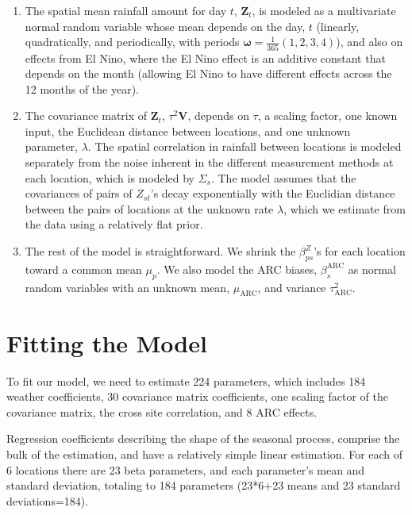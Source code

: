 \documentclass[12pt]{article}
\def\bomega{\pmb{\omega}}
\def\bZ{\pmb{Z}}
\def\bV{\pmb{V}}
\begin{document}
\begin{enumerate}
\item The spatial mean rainfall amount for day $t$, $\bZ_t$, is modeled as a multivariate normal random variable whose mean depends on the day, $t$ (linearly, quadratically, and periodically, with periods $\bomega = \frac{1}{365}(1, 2, 3, 4)$), and also on effects from El Nino, where the El Nino effect is an additive constant that depends on the month (allowing El Nino to have different effects across the 12 months of the year).
\item The covariance matrix of $\bZ_t$, $\tau^2\bV$, depends on $\tau$, a scaling factor, one known input, the Euclidean distance between locations, and one unknown parameter, $\lambda$. The spatial correlation in rainfall between locations is modeled separately from the noise inherent in the different measurement methods at each location, which is modeled by $\Sigma_s$. The model assumes that the covariances of pairs of $Z_{st}$'s decay exponentially with the Euclidian distance between the pairs of locations at the unknown rate $\lambda$, which we estimate from the data using a relatively flat prior.
\item The rest of the model is straightforward. We shrink the $\beta_{ps}^Z$'s for each location toward a common mean $\mu_p$. We also model the ARC biases, $\beta^\text{ARC}_s$ as normal random variables with an unknown mean, $\mu_\text{ARC}$, and variance $\tau_\text{ARC}^2$.
\end{enumerate}

\section{Fitting the Model}
\label{sec:fit}

To fit our model, we need to estimate 224 parameters, which includes 184 weather coefficients, 30 covariance matrix coefficients, one scaling factor of the covariance matrix, the cross site correlation, and 8 ARC effects. 

Regression coefficients describing the shape of the seasonal process, comprise the bulk of the estimation, and have a relatively simple linear estimation. For each of 6 locations there are 23 beta parameters, and each parameter's mean and standard deviation, totaling to 184 parameters (23*6+23 means and 23 standard deviations=184). 
\end{document}
